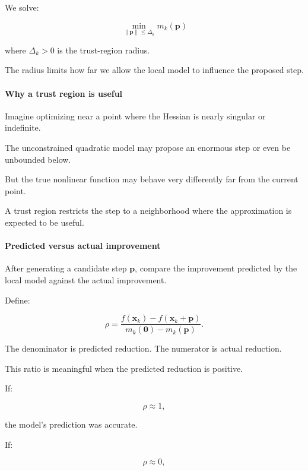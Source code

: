 We solve:

\[
\boxed{ \min_{\|\mathbf p\|\le\Delta_k}m_k(\mathbf p) }
\]

where \(\Delta_k>0\) is the trust-region radius.

The radius limits how far we allow the local model to influence the proposed step.

\paragraph{Why a trust region is useful}\label{02-foundations-ii-ch026-why-a-trust-region-is-useful}

\hypertarget{02-foundations-ii-ch026-why-a-trust-region-is-useful}{}

Imagine optimizing near a point where the Hessian is nearly singular or indefinite.

The unconstrained quadratic model may propose an enormous step or even be unbounded below.

But the true nonlinear function may behave very differently far from the current point.

A trust region restricts the step to a neighborhood where the approximation is expected to be useful.

\paragraph{Predicted versus actual improvement}\label{02-foundations-ii-ch026-predicted-versus-actual-improvement}

\hypertarget{02-foundations-ii-ch026-predicted-versus-actual-improvement}{}

After generating a candidate step \(\mathbf p\), compare the improvement predicted by the local model against the actual improvement.

Define:

\[
\boxed{ \rho= \frac{ f(\mathbf x_k)-f(\mathbf x_k+\mathbf p) }{ m_k(\mathbf 0)-m_k(\mathbf p) } }.
\]

The denominator is predicted reduction. The numerator is actual reduction.

This ratio is meaningful when the predicted reduction is positive.

If:

\[
\rho\approx1,
\]

the model's prediction was accurate.

If:

\[
\rho\approx0,
\]

